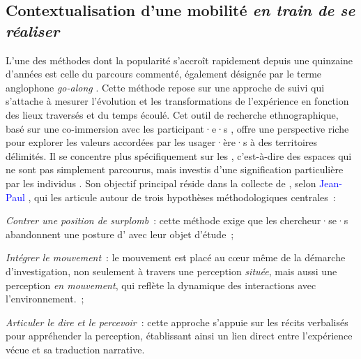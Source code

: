 \begin{refsegment}
\subsection{Contextualisation d'une mobilité \textsl{en train de se réaliser}
    \label{chap3:parcours-commente-definition}
    }

L’une des méthodes  dont la popularité s’accroît rapidement depuis une quinzaine d’années est celle du parcours commenté, également désignée par le terme anglophone \textit{go-along} \textcolor{blue}{\autocite[3]{despres_replacer_2019}}. Cette méthode repose sur une approche de suivi qui s’attache à mesurer l’évolution et les transformations de l’expérience en fonction des lieux traversés et du temps écoulé. Cet outil de recherche ethnographique, basé sur une co-immersion avec les participant·e·s \textcolor{blue}{\autocite[456]{kusenbach_street_2003}}, offre une perspective riche pour explorer les valeurs accordées par les usager·ère·s à des territoires délimités. Il se concentre plus spécifiquement sur les , c’est-à-dire des espaces qui ne sont pas simplement parcourus, mais investis d’une signification particulière par les individus \textcolor{blue}{\autocite[]{fremont_region_1976}}. Son objectif principal réside dans la collecte de , selon \textcolor{blue}{Jean-Paul} \textcolor{blue}{\textcite[83-85]{thibaud_methode_2001}}, qui les articule autour de trois hypothèses méthodologiques centrales~:
    \begin{customitemize}
\item \textsl{Contrer une position de surplomb}~: cette méthode exige que les chercheur·se·s abandonnent une posture d' avec leur objet d'étude~;
\item \textsl{Intégrer le mouvement}~: le mouvement est placé au cœur même de la démarche d’investigation, non seulement à travers une perception \textit{située}, mais aussi une perception \textit{en mouvement}, qui reflète la dynamique des interactions avec l’environnement.~;
\item \textsl{Articuler le \textit{dire} et le \textit{percevoir}}~: cette approche s’appuie sur les récits verbalisés pour appréhender la perception, établissant ainsi un lien direct entre l’expérience vécue et sa traduction narrative.
    \end{customitemize}%


\end{refsegment}
